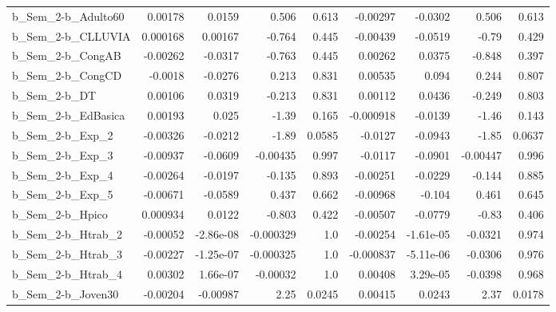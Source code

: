 \begin{tabular}{lrrrrrrrr}
b\_Sem\_2-b\_Adulto60         &     0.00178 &       0.0159 &     0.506 &    0.613 &   -0.00297 &     -0.0302 &        0.506 &         0.613 \\
b\_Sem\_2-b\_CLLUVIA          &    0.000168 &      0.00167 &    -0.764 &    0.445 &   -0.00439 &     -0.0519 &        -0.79 &         0.429 \\
b\_Sem\_2-b\_CongAB           &    -0.00262 &      -0.0317 &    -0.763 &    0.445 &    0.00262 &      0.0375 &       -0.848 &         0.397 \\
b\_Sem\_2-b\_CongCD           &     -0.0018 &      -0.0276 &     0.213 &    0.831 &    0.00535 &       0.094 &        0.244 &         0.807 \\
b\_Sem\_2-b\_DT               &     0.00106 &       0.0319 &    -0.213 &    0.831 &    0.00112 &      0.0436 &       -0.249 &         0.803 \\
b\_Sem\_2-b\_EdBasica         &     0.00193 &        0.025 &     -1.39 &    0.165 &  -0.000918 &     -0.0139 &        -1.46 &         0.143 \\
b\_Sem\_2-b\_Exp\_2            &    -0.00326 &      -0.0212 &     -1.89 &   0.0585 &    -0.0127 &     -0.0943 &        -1.85 &        0.0637 \\
b\_Sem\_2-b\_Exp\_3            &    -0.00937 &      -0.0609 &  -0.00435 &    0.997 &    -0.0117 &     -0.0901 &     -0.00447 &         0.996 \\
b\_Sem\_2-b\_Exp\_4            &    -0.00264 &      -0.0197 &    -0.135 &    0.893 &   -0.00251 &     -0.0229 &       -0.144 &         0.885 \\
b\_Sem\_2-b\_Exp\_5            &    -0.00671 &      -0.0589 &     0.437 &    0.662 &   -0.00968 &      -0.104 &        0.461 &         0.645 \\
b\_Sem\_2-b\_Hpico            &    0.000934 &       0.0122 &    -0.803 &    0.422 &   -0.00507 &     -0.0779 &        -0.83 &         0.406 \\
b\_Sem\_2-b\_Htrab\_2          &    -0.00052 &    -2.86e-08 & -0.000329 &      1.0 &   -0.00254 &   -1.61e-05 &      -0.0321 &         0.974 \\
b\_Sem\_2-b\_Htrab\_3          &    -0.00227 &    -1.25e-07 & -0.000325 &      1.0 &  -0.000837 &   -5.11e-06 &      -0.0306 &         0.976 \\
b\_Sem\_2-b\_Htrab\_4          &     0.00302 &     1.66e-07 &  -0.00032 &      1.0 &    0.00408 &    3.29e-05 &      -0.0398 &         0.968 \\
b\_Sem\_2-b\_Joven30          &    -0.00204 &     -0.00987 &      2.25 &   0.0245 &    0.00415 &      0.0243 &         2.37 &        0.0178 \\

\end{tabular}
